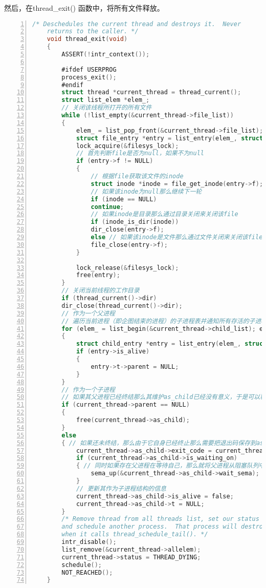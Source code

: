 \documentclass{article}
\begin{document}
	然后，在thread\_exit() 函数中，将所有文件释放。
	
	\begin{lstlisting}[xleftmargin = 4em,xrightmargin = 4em, aboveskip = 1em, numbers = left, language = C,title=src/threads/thread.c - thread\_exit()]
    /* Deschedules the current thread and destroys it.  Never
    returns to the caller. */
    void thread_exit(void)
    {
    	ASSERT(!intr_context());
    	
    	#ifdef USERPROG
    	process_exit();
    	#endif
    	struct thread *current_thread = thread_current();
    	struct list_elem *elem_;
    	// 关闭该线程所打开的所有文件
    	while (!list_empty(&current_thread->file_list))
    	{
    	    elem_ = list_pop_front(&current_thread->file_list);
    	    struct file_entry *entry = list_entry(elem_, struct file_entry, elem);
    	    lock_acquire(&filesys_lock);
    	    // 首先判断file是否为null，如果不为null
    	    if (entry->f != NULL)
    	    {
    	        // 根据file获取该文件的inode
    	        struct inode *inode = file_get_inode(entry->f);
    	        // 如果该inode为null那么继续下一轮
    	        if (inode == NULL)
    	        continue;
    	        // 如果inode是目录那么通过目录关闭来关闭该file
    	        if (inode_is_dir(inode))
    	        dir_close(entry->f);
    	        else // 如果该inode是文件那么通过文件关闭来关闭该file
    	        file_close(entry->f);
    	    }
    	    
    	    lock_release(&filesys_lock);
    	    free(entry);
    	}
    	// 关闭当前线程的工作目录
    	if (thread_current()->dir)
    	dir_close(thread_current()->dir);
    	// 作为一个父进程
    	// 遍历当前进程（即企图结束的进程）的子进程表并通知所有存活的子进程自己已经结束
    	for (elem_ = list_begin(&current_thread->child_list); elem_ != list_end(&current_thread->child_list); elem_ = list_next(elem_))
    	{
    	    struct child_entry *entry = list_entry(elem_, struct child_entry, elem);
    	    if (entry->is_alive)
    	    {
    	        entry->t->parent = NULL;
    	    }
    	}
    	// 作为一个子进程
    	// 如果其父进程已经终结那么其维护as_child已经没有意义，于是可以释放
    	if (current_thread->parent == NULL)
    	{
    	    free(current_thread->as_child);
    	}
    	else
    	{ // 如果还未终结，那么由于它自身已经终止那么需要把退出码保存到as_child结构中
    	    current_thread->as_child->exit_code = current_thread->exit_code;
    	    if (current_thread->as_child->is_waiting_on)
    	    { // 同时如果存在父进程在等待自己，那么就将父进程从阻塞队列中调出
    	        sema_up(&current_thread->as_child->wait_sema);
    	    }
    	    // 更新其作为子进程结构的信息
    	    current_thread->as_child->is_alive = false;
    	    current_thread->as_child->t = NULL;
    	}
    	/* Remove thread from all threads list, set our status to dying,
    	and schedule another process.  That process will destroy us
    	when it calls thread_schedule_tail(). */
    	intr_disable();
    	list_remove(&current_thread->allelem);
    	current_thread->status = THREAD_DYING;
    	schedule();
    	NOT_REACHED();
    }
	\end{lstlisting}
	
\end{document}
